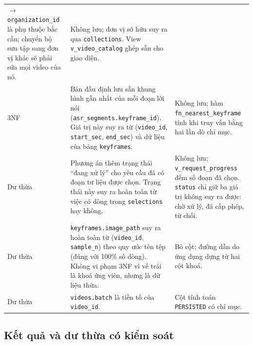 {\begin{longtable}{>{\raggedright\arraybackslash}p{1.4cm} >{\raggedright\arraybackslash}p{6.5cm} >{\raggedright\arraybackslash}p{6.5cm}}
$\rightarrow$ \texttt{organization\_id} là phụ thuộc bắc cầu; chuyển bộ sưu tập sang đơn
vị khác sẽ phải sửa mọi video của nó. &
Không lưu; đơn vị sở hữu suy ra qua \texttt{collections}. View \texttt{v\_video\_catalog}
ghép sẵn cho giao diện. \\
\addlinespace
3NF & Bản đầu định lưu sẵn khung hình gần nhất của mỗi đoạn lời nói
(\texttt{asr\_segments.keyframe\_id}). Giá trị này suy ra từ (\texttt{video\_id},
\texttt{start\_sec}, \texttt{end\_sec}) và dữ liệu của bảng \texttt{keyframes}. &
Không lưu; hàm \texttt{fn\_nearest\_keyframe} tính khi truy vấn bằng hai lần dò chỉ mục. \\
\addlinespace
Dư thừa & Phương án thêm trạng thái ``đang xử lý'' cho yêu cầu đã có đoạn tư liệu được
chọn. Trạng thái này suy ra hoàn toàn từ việc có dòng trong \texttt{selections} hay không. &
Không lưu; \texttt{v\_request\_progress} đếm số đoạn đã chọn. \texttt{status} chỉ giữ ba
giá trị không suy ra được: chờ xử lý, đã cấp phép, từ chối. \\
\addlinespace
Dư thừa & \texttt{keyframes.image\_path} suy ra hoàn toàn từ (\texttt{video\_id},
\texttt{sample\_n}) theo quy ước tên tệp (đúng với 100\% số dòng). Không vi phạm 3NF vì vế
trái là khoá ứng viên, nhưng là dữ liệu thừa. & Bỏ cột; đường dẫn do ứng dụng dựng từ hai
cột khoá. \\
\addlinespace
Dư thừa & \texttt{videos.batch} là tiền tố của \texttt{video\_id}. & Cột tính toán
\texttt{PERSISTED} có chỉ mục. \\
\end{longtable}}

\subsection{Kết quả và dư thừa có kiểm soát}

